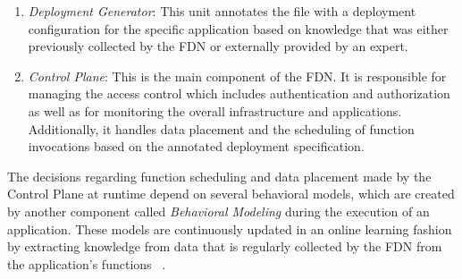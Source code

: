 \begin{enumerate}
    \item \textit{Deployment Generator}: This unit annotates the file with a deployment configuration for the specific application based on knowledge that was either previously collected by the FDN or externally provided by an expert.
    \item \textit{Control Plane}: This is the main component of the FDN. It is responsible for managing the access control which includes authentication and authorization as well as for monitoring the overall infrastructure and applications. Additionally, it handles data placement and the scheduling of function invocations based on the annotated deployment specification.
\end{enumerate}

The decisions regarding function scheduling and data placement made by the Control Plane at runtime depend on several behavioral models, which are created by another component called  \textit{Behavioral Modeling} during the execution of an application. These models are continuously updated in an online learning fashion by extracting knowledge from data that is regularly collected by the FDN from the application's functions ~\parencite{fdn}.